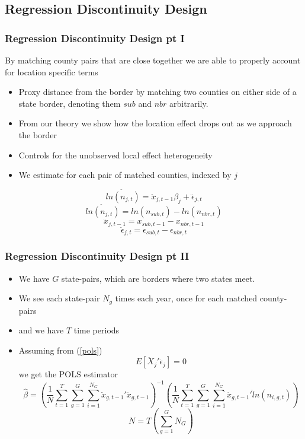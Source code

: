 \documentclass{beamer}
\begin{document}
\begin{frame}
\subsection{Regression Discontinuity Design}
\frametitle{Regression Discontinuity Design pt I}
By matching county pairs that are close together we are able to properly account for location specific terms
\begin{itemize}
\item  Proxy distance from the border by matching two counties on either side of a state border, denoting them $sub$ and $nbr$ arbitrarily.
\item From our theory we show how the location effect drops out as we approach the border
\item Controls for the unobserved local effect heterogeneity
\item We estimate for each pair of matched counties, indexed by $j$
\end{itemize}

\begin{equation} \label{pols}
\ddot{ln(n_{j,t})} = \ddot x_{j,t-1}\beta_{j} + \ddot \epsilon_{j,t}
\end{equation}
 $$\ddot{ln(n_{j,t})} = ln(n_{sub,t})-ln(n_{nbr,t})$$
 $$\ddot x_{j,t-1} = x_{sub,t-1}-x_{nbr,t-1}$$
 $$\ddot \epsilon_{j,t} = \epsilon_{sub,t}-\epsilon_{nbr,t}$$
\end{frame}

\begin{frame}
\frametitle{Regression Discontinuity Design pt II}
\begin{itemize}
\item We have $G$ state-pairs, which are borders where two states meet.
\item We see each state-pair $N_{g}$ times each year, once for each matched county-pairs
\item and we have $T$ time periods
\item Assuming from (\ref{pols}) 
\begin{equation}\label{moment}
E[\ddot X_{j}'\ddot \epsilon_{j}] = 0
\end{equation}
we get the POLS estimator
\begin{equation}\label{polsest}
\hat \beta = \left(\frac{1}{N}\sum_{t=1}^{T}\sum_{g=1}^{G}\sum_{i=1}^{N_{G}}\ddot x_{g,t-1}'\ddot x_{g,t-1}\right)^{-1}\left(\frac{1}{N}\sum_{t=1}^{T}\sum_{g=1}^{G}\sum_{i=1}^{N_{G}}\ddot x_{g,t-1}'\ddot ln(n_{i,g,t})\right)
\end{equation}
\begin{equation}\label{norm}
N = T(\sum_{g=1}^{G}N_{G})
\end{equation}
\end{itemize}
\end{frame}
\end{document}
